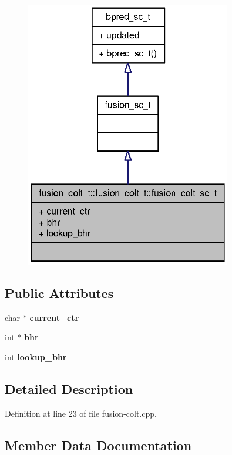 \begin{figure}[H]
\begin{center}
\leavevmode
\includegraphics[width=254pt]{classfusion__colt__t_1_1fusion__colt__sc__t__coll__graph}
\end{center}
\end{figure}
\subsection*{Public Attributes}
\begin{CompactItemize}
\item 
char $\ast$ {\bf current\_\-ctr}
\item 
int $\ast$ {\bf bhr}
\item 
int {\bf lookup\_\-bhr}
\end{CompactItemize}


\subsection{Detailed Description}


Definition at line 23 of file fusion-colt.cpp.

\subsection{Member Data Documentation}
